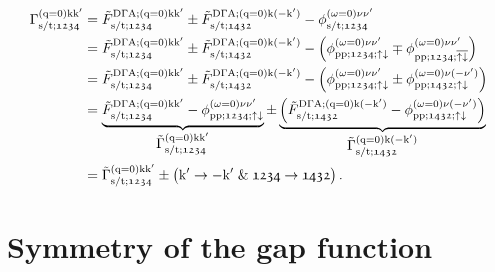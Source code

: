 \documentclass[main.tex]{subfiles}
\begin{document}
\begin{align}\label{eq:pairing_vertex_full_formula}
\begin{split}
	\Gamma_{\text{s}/\text{t};\mathfrak{1234}}^{(\text{q}=0)\text{k}\text{k}'}&=\tilde{F}_{\text{s}/\text{t};\mathfrak{1234}}^{\text{D}\Gamma\text{A};(\text{q}=0)\text{k}\text{k}'}\pm \tilde{F}_{\text{s}/\text{t};\mathfrak{1432}}^{\text{D}\Gamma\text{A};(\text{q}=0)\text{k}(-\text{k}')}-\phi_{\text{s}/\text{t};\mathfrak{1234}}^{(\omega=0)\nu\nu'}\\
	&=\tilde{F}_{\text{s}/\text{t};\mathfrak{1234}}^{\text{D}\Gamma\text{A};(\text{q}=0)\text{k}\text{k}'}\pm \tilde{F}_{\text{s}/\text{t};\mathfrak{1432}}^{\text{D}\Gamma\text{A};(\text{q}=0)\text{k}(-\text{k}')}-\left (\phi_{\text{pp};\mathfrak{1234};\uparrow\downarrow}^{(\omega=0)\nu\nu'}\mp \phi_{\text{pp};\mathfrak{1234};\overline{\uparrow\downarrow}}^{(\omega=0)\nu\nu'}\right )\\
	&=\tilde{F}_{\text{s}/\text{t};\mathfrak{1234}}^{\text{D}\Gamma\text{A};(\text{q}=0)\text{k}\text{k}'}\pm \tilde{F}_{\text{s}/\text{t};\mathfrak{1432}}^{\text{D}\Gamma\text{A};(\text{q}=0)\text{k}(-\text{k}')}-\left (\phi_{\text{pp};\mathfrak{1234};\uparrow\downarrow}^{(\omega=0)\nu\nu'}\pm \phi_{\text{pp};\mathfrak{1432};\uparrow\downarrow}^{(\omega=0)\nu(-\nu')}\right )\\
	&=\underbrace{\tilde{F}_{\text{s}/\text{t};\mathfrak{1234}}^{\text{D}\Gamma\text{A};(\text{q}=0)\text{k}\text{k}'}-\phi_{\text{pp};\mathfrak{1234};\uparrow\downarrow}^{(\omega=0)\nu\nu'}}_{\textstyle\tilde{\Gamma}_{\text{s}/\text{t};\mathfrak{1234}}^{(\text{q}=0)\text{k}\text{k}'}}\pm \underbrace{\left (\tilde{F}_{\text{s}/\text{t};\mathfrak{1432}}^{\text{D}\Gamma\text{A};(\text{q}=0)\text{k}(-\text{k}')}- \phi_{\text{pp};\mathfrak{1432};\uparrow\downarrow}^{(\omega=0)\nu(-\nu')}\right )}_{\textstyle\tilde{\Gamma}_{\text{s}/\text{t};\mathfrak{1432}}^{(\text{q}=0)\text{k}(-\text{k}')}}\\
	&=\tilde{\Gamma}_{\text{s}/\text{t};\mathfrak{1234}}^{(\text{q}=0)\text{k}\text{k}'}\pm \left (\text{k}'\rightarrow -\text{k}'\;\&\; \mathfrak{1234}\rightarrow\mathfrak{1432}\right ).
\end{split}
\end{align}

\newpage

\section{Symmetry of the gap function}
\end{document}

